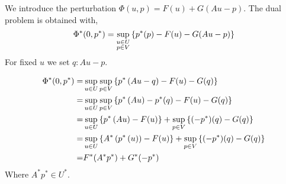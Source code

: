  We introduce the perturbation $\Phi(u, p) = F(u)+G(Au-p)$. The dual problem is obtained with,
 \[
	 {\Phi}^{\ast}(0, {p}^{\ast})=\sup_{\substack{u\in U\\ p \in V} }\left\lbrace {p}^{\ast}(p)-F(u)-G(Au-p)\right\rbrace
 \]
 For fixed $u$ we set $q: Au -p$.
 
 \begin{align*}
 {\Phi}^{\ast}(0, {p}^{\ast})=&\sup_{u\in U} \sup_{p\in V} \left\lbrace{p}^{\ast}\left(Au-q\right)-F(u)-G(q)\right\rbrace\\
 =&\sup_{u\in U} \sup_{p\in V} \left\lbrace{p}^{\ast}\left(Au\right)-{p}^{\ast}(q)-F(u)-G(q)\right\rbrace\\
 =&\sup_{u\in U}  \left\lbrace{p}^{\ast}\left( Au\right)-F(u)\right\rbrace+\sup_{p\in V}\left\lbrace(-{p}^{\ast})(q)-G(q)\right\rbrace\\
  =&\sup_{u\in U}  \left\lbrace{A}^{\ast}\left({p}^{\ast}\left(u\right)\right)-F(u)\right\rbrace+\sup_{p\in V}\left\lbrace(-{p}^{\ast})(q)-G(q)\right\rbrace\\
 =&{F}^{\ast}({A}^{\ast}{p}^{\ast})+{G}^{\ast}(-{p}^{\ast})
 \end{align*}
Where $A^*p^* \in U^{*}$.